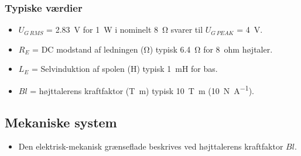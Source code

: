 \subsubsection{Typiske værdier}
\begin{itemize}
	\item $U_{G \,RMS}$ = \SI{2.83}{\volt} for \SI{1}{\watt} i nominelt \SI{8}{\ohm} svarer til $U_{G\, PEAK}$ = \SI{4}{\volt}.
	\item $R_E$ = DC modstand af ledningen (\si{\ohm}) typisk \SI{6.4}{\ohm} for \SI{8}{ohm} højtaler.
	\item $L_E$ = Selvinduktion af spolen (\si{\henry}) typisk \SI{1}{\milli\henry} for bas.
	\item $Bl$ = højttalerens kraftfaktor (\si{\tesla\meter}) typisk \SI{10}{\tesla\meter} (\SI{10}{\newton\per\ampere}).
\end{itemize}

\subsection{Mekaniske system}
\begin{itemize}
	\item Den elektrisk-mekanisk grænseflade beskrives ved højttalerens kraftfaktor $Bl$.
\end{itemize}

